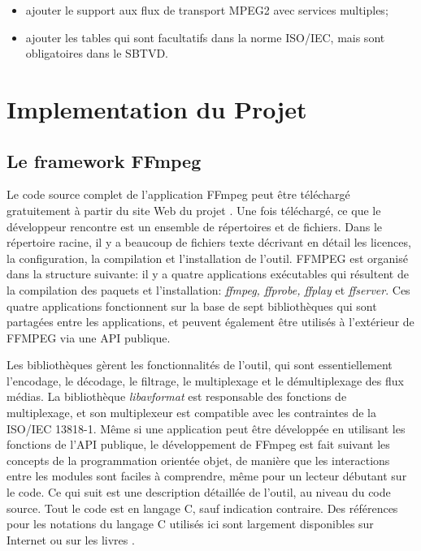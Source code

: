 \documentclass[12pt,a4paper]{article}
\begin{document}
\begin{itemize}
\item{ajouter le support aux flux de transport MPEG2 avec services multiples;} 
\item{ajouter les tables qui sont facultatifs dans la norme ISO/IEC, mais sont obligatoires dans le SBTVD.}
\end{itemize}

\section{Implementation du Projet}
\label{implementation}

\subsection{Le framework FFmpeg}

Le code source complet de l'application FFmpeg peut être téléchargé gratuitement à partir du site Web du projet \cite{ffmpeg}. Une fois téléchargé, ce que le développeur rencontre est un ensemble de répertoires et de fichiers. Dans le répertoire racine, il y a beaucoup de fichiers texte décrivant en détail les licences, la configuration, la compilation et l'installation de l'outil. FFMPEG est organisé dans la structure suivante: il y a quatre applications exécutables qui résultent de la compilation des paquets et l'installation: \textit{ffmpeg, ffprobe, ffplay} et \textit{ffserver}. Ces quatre applications fonctionnent sur la base de sept bibliothèques qui sont partagées entre les applications, et peuvent également être utilisés à l'extérieur de FFMPEG via une API publique. 

Les bibliothèques gèrent les fonctionnalités de l'outil, qui sont essentiellement l'encodage, le décodage, le filtrage, le multiplexage et le démultiplexage des flux médias. La bibliothèque \textit{libavformat} est responsable des fonctions de multiplexage, et son multiplexeur est compatible avec les contraintes de la ISO/IEC 13818-1. Même si une application peut être développée en utilisant les fonctions de l'API publique, le développement de FFmpeg est fait suivant les concepts de la programmation orientée objet, de manière que les interactions entre les modules sont faciles à comprendre, même pour un lecteur débutant sur le code. Ce qui suit est une description détaillée de l'outil, au niveau du code source. Tout le code est en langage C, sauf indication contraire. Des références pour les notations du langage C utilisés ici sont largement disponibles sur Internet \cite{cpp_reference} ou sur les livres \cite{ritchie}.
\end{document}
